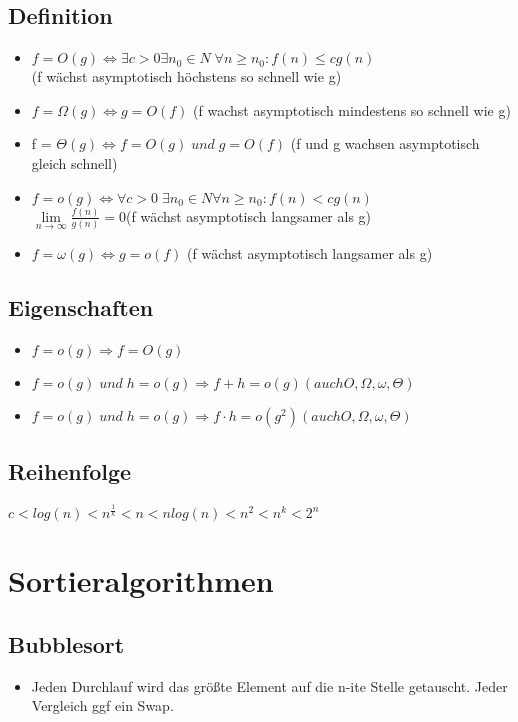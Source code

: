 \documentclass{article}
\begin{document}
\subsection{Definition}
\begin{itemize}
\item $f = O(g) \Leftrightarrow  \exists  c> 0 \exists n_0 \in N \; \forall n \geq n_0 : f(n) \leq c g(n)$ \\ (f w{\"a}chst asymptotisch h{\"o}chstens so schnell wie g)
\item $f = \Omega(g) \Leftrightarrow g = O(f)$ \newline (f wachst asymptotisch mindestens so schnell wie g)

\item f = $\Theta (g) \Leftrightarrow f = O(g) \; und \; g = O(f)$ \newline
(f und g wachsen asymptotisch gleich schnell)
\item $f = o(g) \Leftrightarrow \forall c > 0 \; \exists n_0 \in N \forall n\geq n_0 : f(n) < c g(n)$ \\ 
$ \lim\limits_{n \to \infty}\frac{f(n)}{g(n)} = 0 $\newline (f w{\"a}chst asymptotisch langsamer als g)
\item $f = \omega(g) \Leftrightarrow g = o(f)$ \newline (f w{\"a}chst asymptotisch langsamer als g)
\end{itemize}
\subsection{Eigenschaften}
\begin{itemize}
\item $f = o(g) \Rightarrow f = O(g)$
\item $f = o(g) \; und \;  h = o(g) \Rightarrow f+h = o(g) (auch O, \Omega, \omega, \Theta)$
\item $f = o(g) \; und \;  h = o(g) \Rightarrow f\cdot h = o(g^2) (auch O, \Omega, \omega, \Theta)$
\end{itemize}
\subsection{Reihenfolge}
$c < log(n) < n^{\frac{1}{k}} < n < n log(n) < n^2 < n^k < 2^n$
\section{Sortieralgorithmen}
\subsection {Bubblesort}
\begin{itemize}
\item Jeden Durchlauf wird das gr{\"o}\ss te Element auf die n-ite Stelle getauscht. Jeder Vergleich ggf ein Swap.

\end{itemize}
\end{document}
